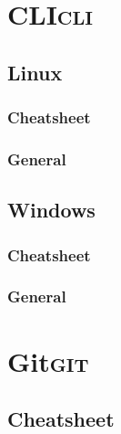 \documentclass[11pt]{article}
\begin{document}
\section{CLI\hfill{}\textsc{cli}}
\label{sec:orgb193e43}
\subsection{Linux}
\label{sec:org5145858}
\subsubsection{Cheatsheet}
\label{sec:org312809a}
\subsubsection{General}
\label{sec:org80cdd52}
\subsection{Windows}
\label{sec:orgddf3198}
\subsubsection{Cheatsheet}
\label{sec:orgfb2becb}
\subsubsection{General}
\label{sec:org2b790c3}
\section{Git\hfill{}\textsc{git}}
\label{sec:orgada34ce}
\subsection{Cheatsheet}
\label{sec:org7e13ce6}
\end{document}

